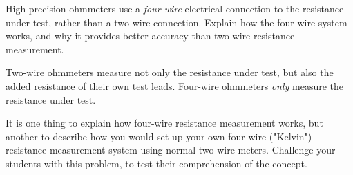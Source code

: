 

High-precision ohmmeters use a {\it four-wire} electrical connection to the resistance under test, rather than a two-wire connection.  Explain how the four-wire system works, and why it provides better accuracy than two-wire resistance measurement.







Two-wire ohmmeters measure not only the resistance under test, but also the added resistance of their own test leads.  Four-wire ohmmeters {\it only} measure the resistance under test.







It is one thing to explain how four-wire resistance measurement works, but another to describe how you would set up your own four-wire ("Kelvin") resistance measurement system using normal two-wire meters.  Challenge your students with this problem, to test their comprehension of the concept.




